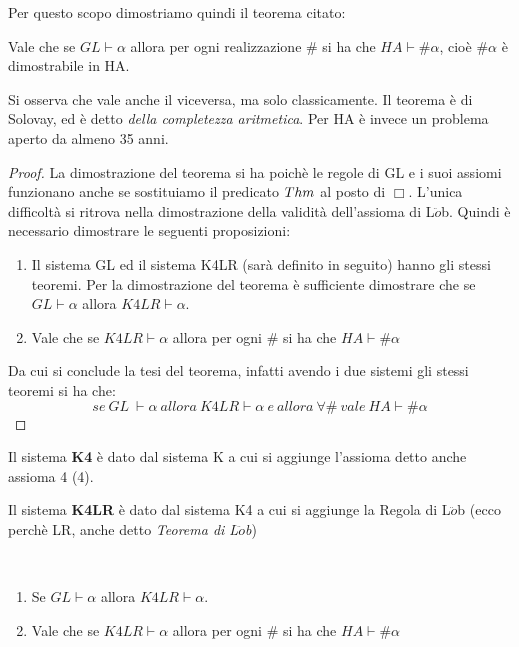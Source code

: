 Per questo scopo dimostriamo quindi il teorema citato:

\begin{thm}
Vale che se $GL \vdash \alpha$ allora per ogni realizzazione $\#$ si ha che 
$HA \vdash \#\alpha$, cio\`e 
$\#\alpha$ \`e dimostrabile in HA.
\end{thm}

\begin{oss}
Si osserva che vale anche il viceversa, ma solo classicamente. 
Il teorema \`e di Solovay, ed \`e detto \textit{della completezza aritmetica}.
Per HA \`e invece un problema aperto da almeno 35 anni.
\end{oss}

\begin{proof}
La dimostrazione del teorema si ha poich\`e le regole di GL e i suoi assiomi funzionano anche se sostituiamo 
il predicato $Thm$ al posto di $\Box$.
L'unica difficoltà si ritrova nella dimostrazione della validità 
dell'assioma di L$\ddot{o}$b.
Quindi \`e necessario dimostrare le seguenti proposizioni:
\begin{enumerate}
\item Il sistema GL ed il sistema K4LR (sarà definito in seguito)
hanno gli stessi teoremi. Per la dimostrazione del teorema \`e sufficiente dimostrare che
se $GL\vdash\alpha$ allora $K4LR\vdash\alpha$.
\item Vale che se $K4LR \vdash \alpha$ allora per ogni $\#$ si ha che 
$HA \vdash \#\alpha$
\end{enumerate}
Da cui si conclude la tesi del teorema, 
infatti avendo i due sistemi gli stessi teoremi si ha che:
$$se~GL~\vdash\alpha~allora~K4LR\vdash\alpha~e~allora~\forall\#~vale~HA\vdash\#\alpha$$
\end{proof}

\begin{defi}
Il sistema \textbf{K4} \`e dato dal sistema K a cui si aggiunge l'assioma
\center{$\vdash\Box\alpha \rightarrow \Box\Box\alpha$}
detto anche assioma 4 (4).
\end{defi}
\begin{defi}
Il sistema\textbf{ K4LR }\`e dato dal sistema K4 a cui si aggiunge la Regola di L$\ddot{o}$b (ecco perch\`e LR, anche detto \textit{Teorema di L$\ddot{o}$b})
\end{defi}



\begin{prop} ~
\begin{enumerate}
\item Se $GL\vdash\alpha$ allora $K4LR\vdash\alpha$.
\item Vale che se $K4LR \vdash \alpha$ allora per ogni $\#$ si ha che 
$HA \vdash \#\alpha$
\end{enumerate}
\end{prop}


